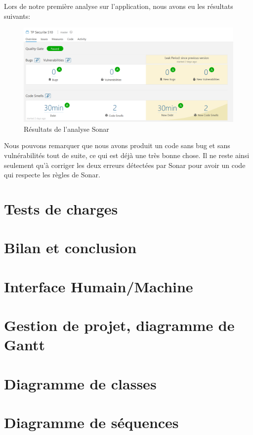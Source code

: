 \documentclass{polytech/polytech}
\begin{document}
Lors de notre première analyse sur l'application, nous avons eu les résultats suivants: 

\begin{figure}
	\includegraphics[scale=0.55]{sonarresult.png}
	\caption{Résultats de l'analyse Sonar}
	\label{fig:sonarresult}
\end{figure}

Nous pouvons remarquer que nous avons produit un code sans bug et sans vulnérabilités tout de suite, ce qui est déjà une très bonne chose. Il ne reste ainsi seulement qu'à corriger les deux erreurs détectées par Sonar pour avoir un code qui respecte les règles de Sonar. 


\chapter{Tests de charges}



\chapter*{Bilan et conclusion}


\appendix

\chapter{Interface Humain/Machine}

\chapter{Gestion de projet, diagramme de Gantt}


\chapter{Diagramme de classes}


\chapter{Diagramme de séquences}
\end{document}
